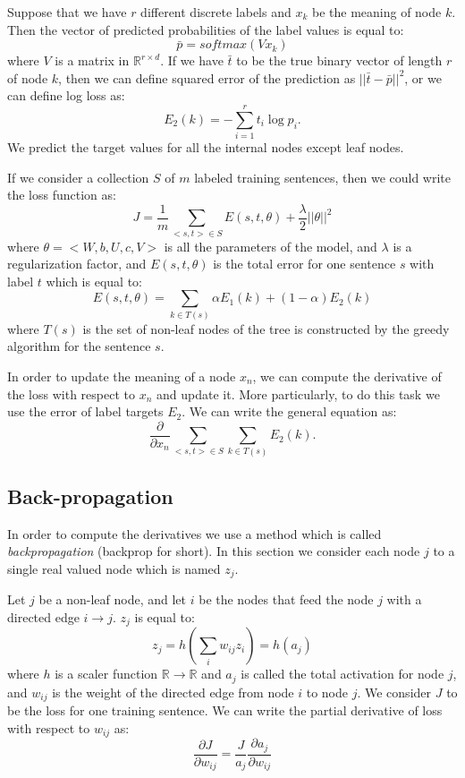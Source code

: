\documentclass[twoside,12pt]{article}
\begin{document}
Suppose that we have $r$ different discrete labels and $x_k$ be the meaning of node $k$. Then the vector of predicted probabilities of the label values is equal to:
\begin{equation}
\bar{p}=softmax(Vx_k)
\end{equation}
where $V$ is a matrix in $\mathbb{R}^{r\times d}$. If we have $\bar{t}$ to be the true binary vector of length $r$ of node $k$, then we can define squared error of the prediction as $||\bar{t}-\bar{p}||^2$, or we can define log loss as:
\begin{equation}
E_2(k)=-\sum_{i=1}^{r}t_i\log{p_i}.
\end{equation}
We predict the target values for all the internal nodes except leaf nodes. 

If we consider a collection $S$ of $m$ labeled training sentences, then we could write the loss function as:
\begin{equation}
J=\frac{1}{m}\sum_{<s,t> \in S}E(s,t,\theta)+\frac{\lambda}{2}||\theta||^2
\end{equation}
where $\theta=<W,b,U,c,V>$ is all the parameters of the model, and $\lambda$ is a regularization factor, and $E(s,t,\theta)$ is the total error for one sentence $s$ with label $t$ which is equal to:
\begin{equation}
E(s,t,\theta)=\sum_{k \in T(s)}\alpha E_1(k)+(1-\alpha)E_2(k)
\end{equation}
where $T(s)$ is the set of non-leaf nodes of the tree is constructed by the greedy algorithm for the sentence $s$. 

In order to update the meaning of a node $x_n$, we can compute the derivative of the loss with respect to $x_n$ and update it. More particularly, to do this task we use the error of label targets $E_2$. We can write the general equation as:
\begin{equation}
\frac{\partial}{\partial x_n}\sum_{<s,t>\in S}\sum_{k \in T(s)}E_2(k).
\end{equation}
\subsection{Back-propagation}
In order to compute the derivatives we use a method which is called \emph{backpropagation} (backprop for short). In this section we consider each node $j$ to a single real valued node which is named $z_j$.

Let $j$ be a non-leaf node, and let $i$ be the nodes that feed the node $j$ with a directed edge $i\rightarrow j$. $z_j$ is equal to:
\begin{equation}
z_j=h(\sum_i w_{ij}z_i)=h(a_j)
\end{equation}
where $h$ is a scaler function $\mathbb{R} \rightarrow \mathbb{R}$ and $a_j$ is called the total activation for node $j$, and $w_{ij}$ is the weight of the directed edge from node $i$ to node $j$. We consider $J$ to be the loss for one training sentence. We can write the partial derivative of loss with respect to $w_{ij}$ as:
\begin{equation}
\frac{\partial J}{\partial w_{ij}}=\frac{J}{a_j}\frac{\partial a_j}{\partial w_{ij}}
\end{equation}
\end{document}
